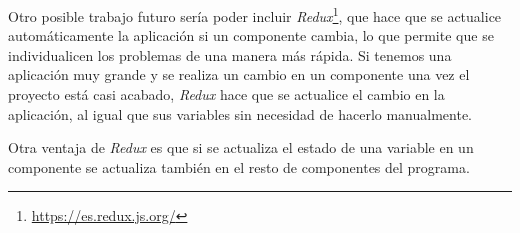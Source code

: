 \documentclass[a4paper, 12pt]{book}
\begin{document}
\vspace{5mm}
Otro posible trabajo futuro sería poder incluir \textit{Redux}\footnote{\url{https://es.redux.js.org/}}, que hace que se actualice automáticamente la aplicación si un componente cambia, lo que permite que se individualicen los problemas de una manera más rápida. Si tenemos una aplicación muy grande y se realiza un cambio en un componente una vez el proyecto está casi acabado, \textit{Redux} hace que se actualice el cambio en la aplicación, al igual que sus variables sin necesidad de hacerlo manualmente.

Otra ventaja de \textit{Redux} es que si se actualiza el estado de una variable en un componente se actualiza también en el resto de componentes del programa.



\cleardoublepage
\appendix




\cleardoublepage



\end{document}
